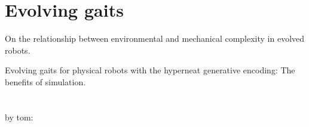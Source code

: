 \section{Evolving gaits}


\cite{auerbach2012relationship} On  the  relationship  between  environmental and mechanical complexity in evolved robots.

\cite{lee2013evolving} Evolving gaits  for  physical  robots  with  the  hyperneat  generative  encoding:   The  benefits  of simulation.


\section*{}

\cite{clune2011performance}
\cite{clune2013evolutionary}
\cite{lipson2000automatic}
\cite{hiller2010evolving}
\cite{rieffel2014growing}
by tom: \cite{Paoletti07092014}

